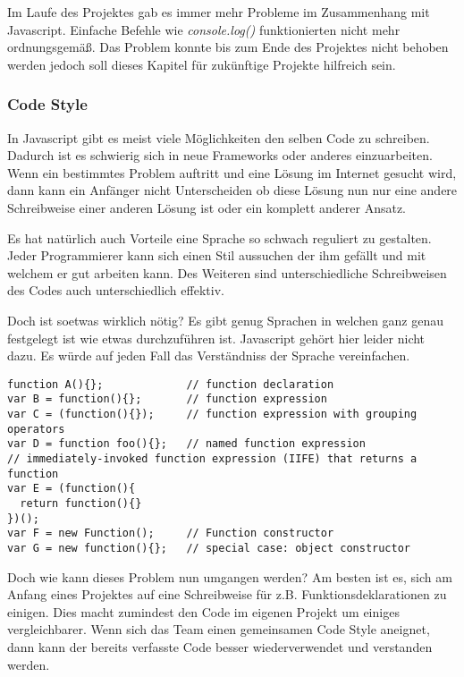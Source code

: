 
Im Laufe des Projektes gab es immer mehr Probleme im Zusammenhang mit Javascript. Einfache Befehle wie \textit{console.log()} funktionierten nicht mehr ordnungsgemäß. Das Problem konnte bis zum Ende des Projektes nicht behoben werden jedoch soll dieses Kapitel für zukünftige Projekte hilfreich sein.

\subsubsection{Code Style}
In Javascript gibt es meist viele Möglichkeiten den selben Code zu schreiben. Dadurch ist es schwierig sich in neue Frameworks oder anderes einzuarbeiten. Wenn ein bestimmtes Problem auftritt und eine Lösung im Internet gesucht wird, dann kann ein Anfänger nicht Unterscheiden ob diese Lösung nun nur eine andere Schreibweise einer anderen Lösung ist oder ein komplett anderer Ansatz. 

Es hat natürlich auch Vorteile eine Sprache so schwach reguliert zu gestalten. Jeder Programmierer kann sich einen Stil aussuchen der ihm gefällt und mit welchem er gut arbeiten kann. Des Weiteren sind unterschiedliche Schreibweisen des Codes auch unterschiedlich effektiv. 

Doch ist soetwas wirklich nötig? Es gibt genug Sprachen in welchen ganz genau festgelegt ist wie etwas durchzuführen ist. Javascript gehört hier leider nicht dazu. Es würde auf jeden Fall das Verständniss der Sprache vereinfachen. 

\begin{lstlisting}[caption = Unterschiedliche Möglichkeiten eine Funktion zu deklarieren\cite{JSOP1}, label = jsopfn]
function A(){};             // function declaration
var B = function(){};       // function expression
var C = (function(){});     // function expression with grouping operators
var D = function foo(){};   // named function expression
// immediately-invoked function expression (IIFE) that returns a function
var E = (function(){ 
  return function(){}
})();
var F = new Function();     // Function constructor
var G = new function(){};   // special case: object constructor

\end{lstlisting}

Doch wie kann dieses Problem nun umgangen werden? Am besten ist es, sich am Anfang eines Projektes auf eine Schreibweise für z.B. Funktionsdeklarationen zu einigen. Dies macht zumindest den Code im eigenen Projekt um einiges vergleichbarer. Wenn sich das Team einen gemeinsamen Code Style aneignet, dann kann der bereits verfasste Code besser wiederverwendet und verstanden werden.

